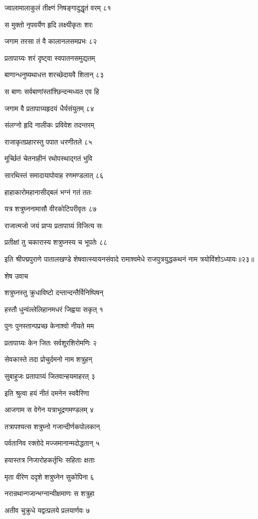 ज्वालामालाकुलं तीक्ष्णं निषङ्गादुद्धृतं वरम् ८१

स मुक्तो नृपवर्येण हृदि लक्ष्यीकृतः शरः

जगाम तरसा तं वै कालानलसमप्रभः ८२

प्रतापाग्र्यः शरं दृष्ट्वा स्वपातनसमुद्यतम्

बाणान्धनुष्यथाधत्त शरच्छेदायवै शितान् ८३

स बाणः सर्वबाणांस्तांश्छिन्दन्मध्यत एव हि

जगाम वै प्रतापाग्र्यहृदयं धैर्यसंयुतम् ८४

संलग्नो हृदि नालीकः प्रविवेश तदन्तरम्

राजाकृतप्रहारस्तु पपात धरणीतले ८५

मूर्च्छितं चेतनाहीनं रथोपस्थाद्गतं भुवि

सारथिस्तं समादायापोवाह रणमण्डलात् ८६

हाहाकारोमहानासीद्बलं भग्नं गतं ततः

यत्र शत्रुघ्ननामासौ वीरकोटिपरीवृतः ८७

राजात्मजो जयं प्राप्य प्रतापाग्र्यं विजित्य सः

प्रतीक्षां तु चकारास्य शत्रुघ्नस्य च भूपतेः ८८

इति श्रीपद्मपुराणे पातालखण्डे शेषवात्स्यायनसंवादे रामाश्वमेधे राजपुत्रयुद्धकथनं नाम त्रयोविंशोऽध्यायः॥२३॥


शेष उवाच

शत्रुघ्नस्तु क्रुधाविष्टो दन्तान्दन्तैर्विनिष्पिषन्

हस्तौ धुन्वंल्लेलिहानमधरं जिह्वया सकृत् १

पुनः पुनस्तान्पप्रच्छ केनाश्वो नीयते मम

प्रतापाग्र्यः केन जितः सर्वशूरशिरोमणिः २

सेवकास्ते तदा प्रोचुर्दमनो नाम शत्रुहन्

सुबाहुजः प्रतापाग्र्यं जितवान्हयमाहरत् ३

इति श्रुत्वा हयं नीतं दमनेन स्ववैरिणा

आजगाम स वेगेन यत्राभूद्रणमण्डलम् ४

तत्रापश्यत्स शत्रुघ्नो गजान्दीर्णकपोलकान्

पर्वतानिव रक्तोदे मज्जमानान्मदोद्धतान् ५

हयास्तत्र निजारोहकर्तृभिः सहिताः क्षताः

मृता वीरेण ददृशे शत्रुघ्नेन सुकोपिना ६

नरान्रथान्गजान्भग्नान्वीक्षमाणः स शत्रुहा

अतीव चुक्रुधे यद्वत्प्रलये प्रलयार्णवः ७

